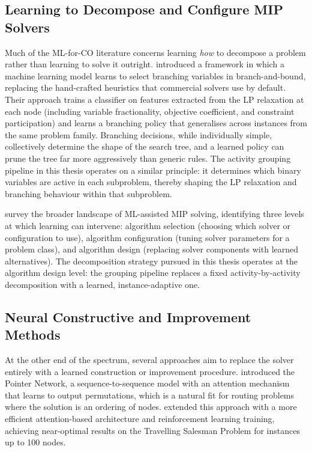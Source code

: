 \subsection*{Learning to Decompose and Configure MIP Solvers}
Much of the ML-for-CO literature concerns learning \textit{how} to
decompose a problem rather than learning to solve it outright. \cite{Khalil2016}
introduced a framework in which a machine learning model learns to select branching
variables in branch-and-bound, replacing the hand-crafted heuristics that commercial
solvers use by default. Their approach trains a classifier on features extracted from
the LP relaxation at each node (including variable fractionality, objective
coefficient, and constraint participation) and learns a branching policy that
generalises across instances from the same problem family. Branching decisions, while individually simple, collectively determine the shape of the
search tree, and a learned policy can prune the tree far more aggressively than generic
rules. The activity grouping pipeline in this thesis operates on a similar principle:
it determines which binary variables are active in each subproblem, thereby
shaping the LP relaxation and branching behaviour within that subproblem.

\cite{Lodi2020} survey the broader landscape of ML-assisted MIP solving, identifying
three levels at which learning can intervene: algorithm selection (choosing which solver
or configuration to use), algorithm configuration (tuning solver parameters for a
problem class), and algorithm design (replacing solver components with learned
alternatives). The decomposition strategy pursued in this thesis operates at the
algorithm design level: the grouping pipeline replaces a fixed activity-by-activity
decomposition with a learned, instance-adaptive one.

\subsection*{Neural Constructive and Improvement Methods}
At the other end of the spectrum, several approaches aim to replace the solver entirely
with a learned construction or improvement procedure. \cite{Vinyals2015} introduced the
Pointer Network, a sequence-to-sequence model with an attention mechanism that learns
to output permutations, which is a natural fit for routing problems where the solution is an
ordering of nodes. \cite{Kool2019} extended this approach with a more efficient
attention-based architecture and reinforcement learning training, achieving
near-optimal results on the Travelling Salesman Problem for instances up to 100 nodes.

